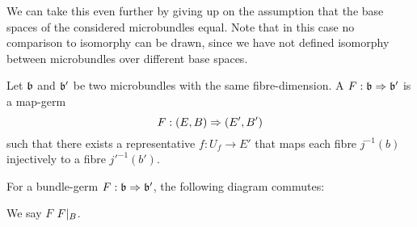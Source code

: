 \begin{myparagraph}
    We can take this even further by giving up on the assumption that the base spaces of the considered microbundles equal.
    Note that in this case no comparison to isomorphy can be drawn,
    since we have not defined isomorphy between microbundles over different base spaces.
\end{myparagraph}

\begin{mydefinition}
    Let $\mathfrak{b}$ and $\mathfrak{b}'$ be two microbundles with the same fibre-dimension.
    A  $F: \mathfrak{b} \Rightarrow \mathfrak{b}'$ is a map-germ
    \[ F: (E, B) \Rightarrow (E', B') \]
    such that there exists a representative $f: U_f \to E'$ that maps each fibre $j^{-1}(b)$ injectively to a fibre $j'^{-1}(b')$.
\end{mydefinition}

\begin{myparagraph}
    For a bundle-germ $F: \mathfrak{b} \Rightarrow \mathfrak{b}'$, the following diagram commutes:
    \begin{center}
    \end{center}
    We say $F$  $F\vert_{B}$.
\end{myparagraph}